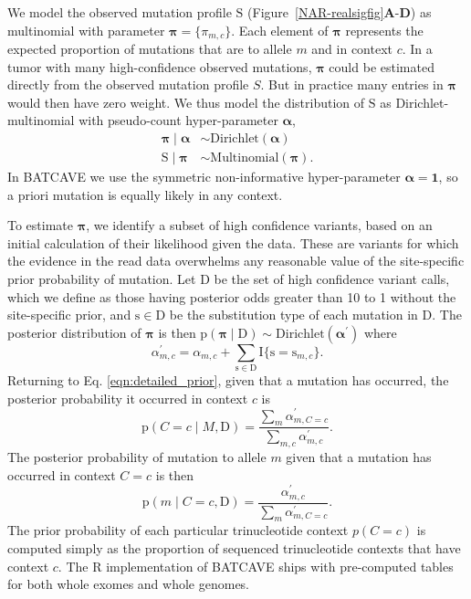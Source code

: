 \documentclass[a4,center,fleqn]{NAR}
\newcommand{\batcave}{BATCAVE }
\begin{document}
We model the observed mutation profile $\mathrm{S}$ (Figure~\ref{NAR-realsigfig}\textbf{A}-\textbf{D}) as multinomial with parameter $\boldsymbol{\pi} = \{\pi_{m,c}\}$.
Each element of $\boldsymbol{\pi}$ represents the expected proportion of mutations that are to allele $m$ and in context $c$.
In a tumor with many high-confidence observed mutations, $\boldsymbol{\pi}$ could be estimated directly from the observed mutation profile $S$.
But in practice many entries in $\boldsymbol{\pi}$ would then have zero weight.
We thus model the distribution of $\mathrm{S}$ as Dirichlet-multinomial with pseudo-count hyper-parameter $\boldsymbol{\alpha}$, 
\begin{equation}
\begin{aligned}
  \boldsymbol{\pi} \mid \boldsymbol{\alpha} &\sim \textrm{Dirichlet}(\boldsymbol{\alpha}) \\
  \mathrm{S} \mid \boldsymbol{\pi} & \sim \textrm{Multinomial}(\boldsymbol{\pi}).
\end{aligned}
\end{equation}
In \batcave we use the symmetric non-informative hyper-parameter $\boldsymbol{\alpha} = \boldsymbol{1}$, so a priori mutation is equally likely in any context.

To estimate $\boldsymbol{\pi}$, we identify a subset of high confidence variants, based on an initial calculation of their likelihood given the data.
These are variants for which the evidence in the read data overwhelms any reasonable value of the site-specific prior probability of mutation.
Let $\mathrm{D}$ be the set of high confidence variant calls, which we define as those having posterior odds greater than 10 to 1 without the site-specific prior, and $\mathrm{s} \in \mathrm{D}$ be the substitution type of each mutation in $\mathrm{D}$.
The posterior distribution of $\boldsymbol{\pi}$ is then $\mathrm{p}(\boldsymbol{\pi} \mid \mathrm{D}) \sim \textrm{Dirichlet}(\boldsymbol{\alpha^{\prime}})$ where
\begin{equation}
    \alpha^{\prime}_{m,c} = \alpha_{m,c} + \sum\limits_{\mathrm{s} \in \mathrm{D}} \mathrm{I}\{\mathrm{s} = \mathrm{s}_{m,c}\}.
\end{equation}
Returning to Eq. \ref{eqn:detailed_prior}, given that a mutation has occurred, the posterior probability it occurred in context $c$ is
\begin{equation}
  \label{eqn:post_pred}
  \mathrm{p}(C = c \mid M,\mathrm{D}) = \frac{\sum_{m}\alpha^{\prime}_{m,C = c}}{\sum_{m,c}\alpha^{\prime}_{m,c}}.
\end{equation}
The posterior probability of mutation to allele $m$ given that a mutation has occurred in context $C = c$ is then
\begin{equation}
  \label{eqn:to_allele}
   \mathrm{p}(m \mid C = c,\mathrm{D}) = \frac{\alpha^{\prime}_{m,c}}{\sum_{m} \alpha^{\prime}_{m,C = c}}.
\end{equation}
The prior probability of each particular trinucleotide context $p(C = c)$ is computed simply as the proportion of sequenced trinucleotide contexts that have context $c$.
The R implementation of \batcave ships with pre-computed tables for both whole exomes and whole genomes.
\end{document}
